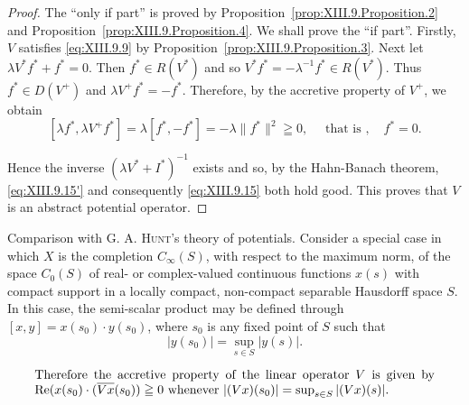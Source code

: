 \begin{proof}
 The ``only if part'' is proved by Proposition~\ref{prop:XIII.9.Proposition.2} and Proposition~\ref{prop:XIII.9.Proposition.4}. We shall prove the ``if part''. Firstly, $V$ satisfies \eqref{eq:XIII.9.9} by Proposition~\ref{prop:XIII.9.Proposition.3}. Next let $\lambda V^{*}f^{*} + f^{*} = 0$. Then $f^{*} \in R(V^{*})$ and so $V^{*}f^{*} = -\lambda^{-1}f^{*} \in R(V^{*})$. Thus $f^{*} \in D(V^{+})$ and $\lambda V^{+}f^{*} = -f^{*}$. Therefore, by the accretive property of $V^{+}$, we obtain 
\[
[ \lambda f ^{*}, \lambda V ^{+} f ^{*} ] = \lambda [ f ^{*}, - f ^{*} ] = - \lambda \| f ^{*} \| ^{2} \geqq 0, \quad \text{ that is }, \quad f ^{*} = 0. \]

Hence the inverse $(\lambda V^{*} + I^{*})^{-1}$ exists and so, by the Hahn-Banach theorem, \eqref{eq:XIII.9.15'} and consequently \eqref{eq:XIII.9.15} both hold good. This proves that $V$ is an abstract potential operator. 
\end{proof}

Comparison with G. A. \textsc{Hunt}'s theory of potentials. Consider a special case in which $X$ is the completion $C_{\infty}(S)$, with respect to the maximum norm, of the space $C_{0}(S)$ of real- or complex-valued continuous functions $x(s)$ with compact support in a locally compact, non-compact separable Hausdorff space $S$. In this case, the semi-scalar product may be defined through 
$[x, y] = x(s_0) \cdot y(s_0)$, where $s_0$ is any fixed point of $S$ such that 
\begin{equation}\label{eq:XIII.9.27}
| y (s _{0}) | = \sup\limits _{s \in S} | y (s) |.
\end{equation}

\begin{equation}\label{eq:XIII.9.28}
\parbox{0.92\linewidth}{\everymath{}\let\limits\nolimits Therefore the accretive property of the linear operator $V$ is given by $\operatorname{Re}(x(s_0) \cdot (\overline{Vx}(s_0)) \geqq 0$ whenever $|(Vx)(s_0)| = \sup\limits_{s \in S} |(Vx)(s)|$.}
\end{equation}

